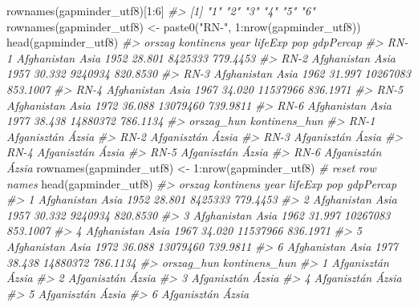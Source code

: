 \documentclass[
]{book}
\newenvironment{Shaded}{\begin{snugshade}}{\end{snugshade}}
\newcommand{\CommentTok}[1]{\textcolor[rgb]{0.56,0.35,0.01}{\textit{#1}}}
\newcommand{\DecValTok}[1]{\textcolor[rgb]{0.00,0.00,0.81}{#1}}
\newcommand{\FunctionTok}[1]{\textcolor[rgb]{0.00,0.00,0.00}{#1}}
\newcommand{\NormalTok}[1]{#1}
\newcommand{\OtherTok}[1]{\textcolor[rgb]{0.56,0.35,0.01}{#1}}
\newcommand{\SpecialCharTok}[1]{\textcolor[rgb]{0.00,0.00,0.00}{#1}}
\newcommand{\StringTok}[1]{\textcolor[rgb]{0.31,0.60,0.02}{#1}}
\begin{document}
\begin{Shaded}
\begin{Highlighting}[]
\FunctionTok{rownames}\NormalTok{(gapminder\_utf8)[}\DecValTok{1}\SpecialCharTok{:}\DecValTok{6}\NormalTok{]}
\CommentTok{\#\textgreater{} [1] "1" "2" "3" "4" "5" "6"}
\FunctionTok{rownames}\NormalTok{(gapminder\_utf8) }\OtherTok{\textless{}{-}} \FunctionTok{paste0}\NormalTok{(}\StringTok{"RN{-}"}\NormalTok{, }\DecValTok{1}\SpecialCharTok{:}\FunctionTok{nrow}\NormalTok{(gapminder\_utf8))}
\FunctionTok{head}\NormalTok{(gapminder\_utf8)}
\CommentTok{\#\textgreater{}           orszag kontinens year lifeExp      pop gdpPercap}
\CommentTok{\#\textgreater{} RN{-}1 Afghanistan      Asia 1952  28.801  8425333  779.4453}
\CommentTok{\#\textgreater{} RN{-}2 Afghanistan      Asia 1957  30.332  9240934  820.8530}
\CommentTok{\#\textgreater{} RN{-}3 Afghanistan      Asia 1962  31.997 10267083  853.1007}
\CommentTok{\#\textgreater{} RN{-}4 Afghanistan      Asia 1967  34.020 11537966  836.1971}
\CommentTok{\#\textgreater{} RN{-}5 Afghanistan      Asia 1972  36.088 13079460  739.9811}
\CommentTok{\#\textgreater{} RN{-}6 Afghanistan      Asia 1977  38.438 14880372  786.1134}
\CommentTok{\#\textgreater{}       orszag\_hun kontinens\_hun}
\CommentTok{\#\textgreater{} RN{-}1 Afganisztán         Ázsia}
\CommentTok{\#\textgreater{} RN{-}2 Afganisztán         Ázsia}
\CommentTok{\#\textgreater{} RN{-}3 Afganisztán         Ázsia}
\CommentTok{\#\textgreater{} RN{-}4 Afganisztán         Ázsia}
\CommentTok{\#\textgreater{} RN{-}5 Afganisztán         Ázsia}
\CommentTok{\#\textgreater{} RN{-}6 Afganisztán         Ázsia}
\FunctionTok{rownames}\NormalTok{(gapminder\_utf8) }\OtherTok{\textless{}{-}} \DecValTok{1}\SpecialCharTok{:}\FunctionTok{nrow}\NormalTok{(gapminder\_utf8) }\CommentTok{\# reset row names}
\FunctionTok{head}\NormalTok{(gapminder\_utf8)}
\CommentTok{\#\textgreater{}        orszag kontinens year lifeExp      pop gdpPercap}
\CommentTok{\#\textgreater{} 1 Afghanistan      Asia 1952  28.801  8425333  779.4453}
\CommentTok{\#\textgreater{} 2 Afghanistan      Asia 1957  30.332  9240934  820.8530}
\CommentTok{\#\textgreater{} 3 Afghanistan      Asia 1962  31.997 10267083  853.1007}
\CommentTok{\#\textgreater{} 4 Afghanistan      Asia 1967  34.020 11537966  836.1971}
\CommentTok{\#\textgreater{} 5 Afghanistan      Asia 1972  36.088 13079460  739.9811}
\CommentTok{\#\textgreater{} 6 Afghanistan      Asia 1977  38.438 14880372  786.1134}
\CommentTok{\#\textgreater{}    orszag\_hun kontinens\_hun}
\CommentTok{\#\textgreater{} 1 Afganisztán         Ázsia}
\CommentTok{\#\textgreater{} 2 Afganisztán         Ázsia}
\CommentTok{\#\textgreater{} 3 Afganisztán         Ázsia}
\CommentTok{\#\textgreater{} 4 Afganisztán         Ázsia}
\CommentTok{\#\textgreater{} 5 Afganisztán         Ázsia}
\CommentTok{\#\textgreater{} 6 Afganisztán         Ázsia}
\end{Highlighting}
\end{Shaded}
\end{document}
